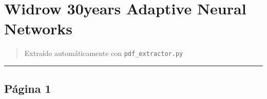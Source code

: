 \section{Widrow 30years Adaptive Neural
Networks}\label{widrow-30years-adaptive-neural-networks}

\begin{quote}
Extraído automáticamente con \texttt{pdf\_extractor.py}
\end{quote}

\begin{center}\rule{0.5\linewidth}{0.5pt}\end{center}

\subsection{Página 1}\label{puxe1gina-1}

